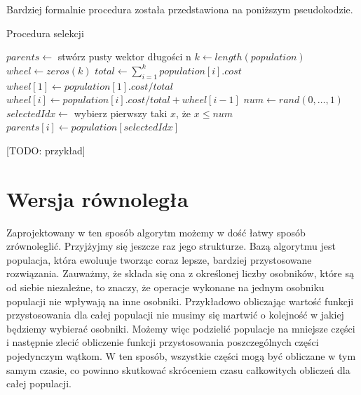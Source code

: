 Bardziej formalnie procedura została przedstawiona na poniższym pseudokodzie.

\begin{pseudokod}[H]
    \label{selekcja}
    \caption{Procedura selekcji}
    \BlankLine
    $parents \gets$ stwórz pusty wektor długości n\;
    $k \gets length(population)$\;
    $wheel \gets zeros(k)$
    \BlankLine
    $total \gets \sum_{i=1}^{k} population[i].cost$\;
    $wheel[1] \gets population[1].cost / total$\;
     {
        $wheel[i] \gets population[i].cost / total + wheel[i-1]$\;
    }
    \BlankLine
     {
        $num \gets rand(0,\dots, 1)$
        $selectedIdx \gets$ wybierz pierwszy taki $x$, że $x \le num$\;
        $parents[i] \gets population[selectedIdx]$\;
    }

\end{pseudokod}


[TODO: przykład]

\section{Wersja równoległa}

Zaprojektowany w ten sposób algorytm możemy w dość łatwy sposób zrównoleglić. Przyjżyjmy się jeszcze raz jego strukturze. Bazą algorytmu jest 
populacja, która ewoluuje tworząc coraz lepsze, bardziej przystosowane rozwiązania. Zauważmy, że składa się ona z określonej liczby osobników, 
które są od siebie niezależne, to znaczy, że operacje wykonane na jednym osobniku populacji nie wpływają na inne osobniki. Przykładowo 
obliczając wartość funkcji przystosowania dla całej populacji nie musimy się martwić o kolejność w jakiej będziemy wybierać osobniki. Możemy więc 
podzielić populacje na mniejsze części i następnie zlecić obliczenie funkcji przystosowania poszczególnych części pojedynczym wątkom. W ten 
sposób, wszystkie części mogą być obliczane w tym samym czasie, co powinno skutkować skróceniem czasu całkowitych obliczeń dla całej populacji.

